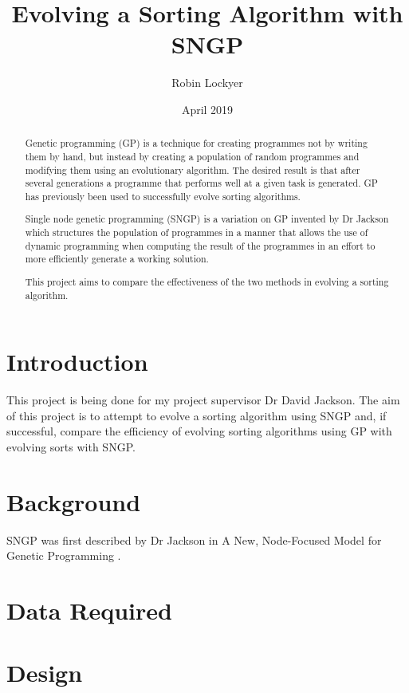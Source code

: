 \documentclass{article}
\title{Evolving a Sorting Algorithm with SNGP}
\author{Robin Lockyer}
\date{April 2019}
\affil{University of Liverpool}
\begin{document}
	
	\maketitle	
	
	\begin{abstract}
		
		Genetic programming (GP) is a technique for creating programmes not by writing them by hand, but instead by creating a population of random programmes and modifying them using an evolutionary algorithm. The desired result is that after several generations a programme that performs well at a given task is generated. GP has previously been used to successfully evolve sorting algorithms.
		
		Single node genetic programming (SNGP) is a variation on GP invented by Dr Jackson which structures the population of programmes in a manner that allows the use of dynamic programming when computing the result of the programmes in an effort to more efficiently generate a working solution.
		
		This project aims to compare the effectiveness of the two methods in evolving a sorting algorithm.
		
	\end{abstract}

	\tableofcontents
	
	\section{Introduction}
	
		This project is being done for my project supervisor Dr David Jackson. The aim of this project is to attempt to evolve a sorting algorithm using SNGP and, if successful, compare the efficiency of evolving sorting algorithms using GP with evolving sorts with SNGP.
	
	\section{Background}
	
		SNGP was first described by Dr Jackson in A New, Node-Focused Model for Genetic Programming \cite{jackson_new_2012}.
		
		
	
	\section{Data Required}
	
	\section{Design}
	
\end{document}
